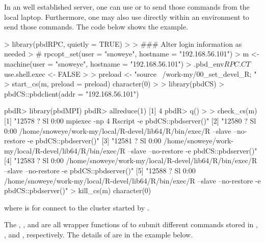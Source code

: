 In an well established server, one can use  or 
to send those commands from the local laptop.
Furthermore, one may also use  directly within an 
environment to send those commands. The code below shows the example.
\begin{Code}[title=Using \pkg{pbdRPC} to control \pkg{pbdCS}]
> library(pbdRPC, quietly = TRUE)
>
> ### Alter login information as needed
> # rpcopt_set(user = "snoweye", hostname = "192.168.56.101")
> m <- machine(user = "snoweye", hostname = "192.168.56.101")
> .pbd_env$RPC.CT$use.shell.exec <- FALSE
>
> preload <- "source ~/work-my/00_set_devel_R; "
> start_cs(m, preload = preload)
character(0)
>
> library(pbdCS)
> pbdCS::pbdclient(addr = "192.168.56.101")

pbdR> library(pbdMPI)
pbdR> allreduce(1)
[1] 4 
pbdR> q()
>
> check_cs(m)
[1] "12578 ?        Sl     0:00 mpiexec -np 4 Rscript -e pbdCS::pbdserver()"                                                      
[2] "12580 ?        Sl     0:00 /home/snoweye/work-my/local/R-devel/lib64/R/bin/exec/R --slave --no-restore -e pbdCS::pbdserver()"
[3] "12581 ?        Sl     0:00 /home/snoweye/work-my/local/R-devel/lib64/R/bin/exec/R --slave --no-restore -e pbdCS::pbdserver()"
[4] "12583 ?        Sl     0:00 /home/snoweye/work-my/local/R-devel/lib64/R/bin/exec/R --slave --no-restore -e pbdCS::pbdserver()"
[5] "12588 ?        Sl     0:00 /home/snoweye/work-my/local/R-devel/lib64/R/bin/exec/R --slave --no-restore -e pbdCS::pbdserver()"
> kill_cs(m)
character(0)
\end{Code}
where  is for connect to the  cluster
started by .

The , , and  are
all wrapper functions of  to submit different commands stored in
, , and
, respectively.
The details of  are in the example below.

